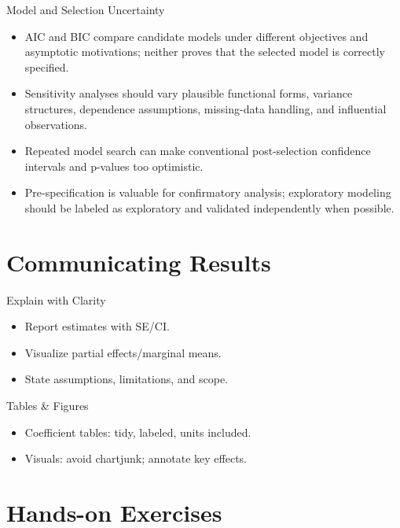 \documentclass[aspectratio=169]{beamer}
\begin{document}
\begin{frame}{Model and Selection Uncertainty}
\begin{itemize}
  \item AIC and BIC compare candidate models under different objectives and asymptotic motivations; neither proves that the selected model is correctly specified.
  \item Sensitivity analyses should vary plausible functional forms, variance structures, dependence assumptions, missing-data handling, and influential observations.
  \item Repeated model search can make conventional post-selection confidence intervals and p-values too optimistic.
  \item Pre-specification is valuable for confirmatory analysis; exploratory modeling should be labeled as exploratory and validated independently when possible.
\end{itemize}
\end{frame}

\section{Communicating Results}

\begin{frame}{Explain with Clarity}
\begin{itemize}
  \item Report estimates with SE/CI.
  \item Visualize partial effects/marginal means.
  \item State assumptions, limitations, and scope.
\end{itemize}
\end{frame}

\begin{frame}{Tables \& Figures}
\begin{itemize}
  \item Coefficient tables: tidy, labeled, units included.
  \item Visuals: avoid chartjunk; annotate key effects.
\end{itemize}
\end{frame}

\section{Hands-on Exercises}
\end{document}
